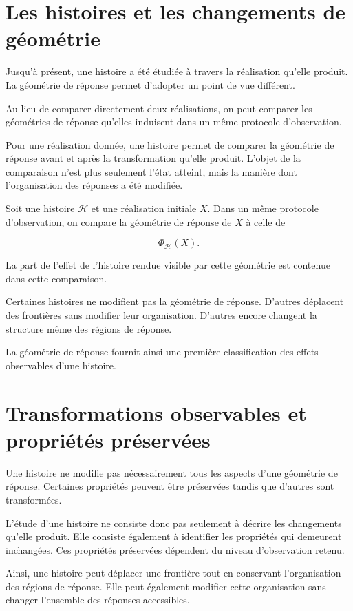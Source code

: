\section{Les histoires et les changements de géométrie}
\label{t3-histoires-changements-geometries}

Jusqu'à présent, une histoire a été étudiée à travers la réalisation qu'elle produit. La géométrie de réponse permet d'adopter un point de vue différent.

Au lieu de comparer directement deux réalisations, on peut comparer les géométries de réponse qu'elles induisent dans un même protocole d'observation.

Pour une réalisation donnée, une histoire permet de comparer la géométrie de réponse avant et après la transformation qu'elle produit. L'objet de la comparaison n'est plus seulement l'état atteint, mais la manière dont l'organisation des réponses a été modifiée.

Soit une histoire \(\mathcal H\) et une réalisation initiale \(X\).
Dans un même protocole d'observation, on compare la géométrie de réponse de \(X\) à celle de

\[
\Phi_{\mathcal H}(X).
\]

La part de l'effet de l'histoire rendue visible par cette géométrie est contenue dans cette comparaison.

Certaines histoires ne modifient pas la géométrie de réponse. D'autres déplacent des frontières sans modifier leur organisation. D'autres encore changent la structure même des régions de réponse.

La géométrie de réponse fournit ainsi une première classification des
effets observables d'une histoire.

\section{Transformations observables et propriétés préservées}
\label{t3-transformations-observables}

Une histoire ne modifie pas nécessairement tous les aspects d'une géométrie de réponse. Certaines propriétés peuvent être préservées tandis que d'autres sont transformées.

L'étude d'une histoire ne consiste donc pas seulement à décrire les changements qu'elle produit. Elle consiste également à identifier les propriétés qui demeurent inchangées. Ces propriétés préservées dépendent du niveau d'observation retenu.

Ainsi, une histoire peut déplacer une frontière tout en conservant l'organisation des régions de réponse. Elle peut également modifier cette organisation sans changer l'ensemble des réponses accessibles.

